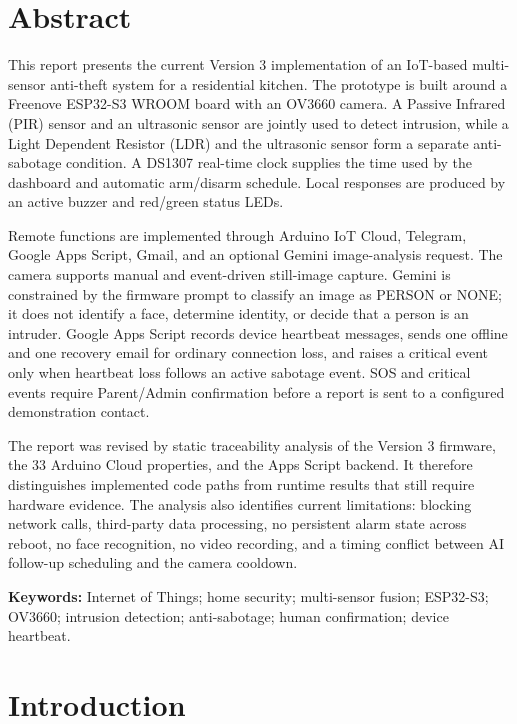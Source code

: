 \documentclass[11pt,a4paper]{report}
\begin{document}
\chapter*{Abstract}
This report presents the current Version 3 implementation of an IoT-based
multi-sensor anti-theft system for a residential kitchen. The prototype is
built around a Freenove ESP32-S3 WROOM board with an OV3660 camera. A Passive
Infrared (PIR) sensor and an ultrasonic sensor are jointly used to detect
intrusion, while a Light Dependent Resistor (LDR) and the ultrasonic sensor
form a separate anti-sabotage condition. A DS1307 real-time clock supplies the
time used by the dashboard and automatic arm/disarm schedule. Local responses
are produced by an active buzzer and red/green status LEDs.

Remote functions are implemented through Arduino IoT Cloud, Telegram, Google
Apps Script, Gmail, and an optional Gemini image-analysis request. The camera
supports manual and event-driven still-image capture. Gemini is constrained by
the firmware prompt to classify an image as PERSON or NONE; it does not
identify a face, determine identity, or decide that a person is an intruder.
Google Apps Script records device heartbeat messages, sends one offline and
one recovery email for ordinary connection loss, and raises a critical event
only when heartbeat loss follows an active sabotage event. SOS and critical
events require Parent/Admin confirmation before a report is sent to a
configured demonstration contact.

The report was revised by static traceability analysis of the Version 3
firmware, the 33 Arduino Cloud properties, and the Apps Script backend. It
therefore distinguishes implemented code paths from runtime results that still
require hardware evidence. The analysis also identifies current limitations:
blocking network calls, third-party data processing, no persistent alarm state
across reboot, no face recognition, no video recording, and a timing conflict
between AI follow-up scheduling and the camera cooldown.

\noindent\textbf{Keywords:} Internet of Things; home security; multi-sensor
fusion; ESP32-S3; OV3660; intrusion detection; anti-sabotage; human
confirmation; device heartbeat.

\clearpage
\tableofcontents
\listoffigures
\listoftables
\clearpage
{}

\chapter{Introduction}
\end{document}
